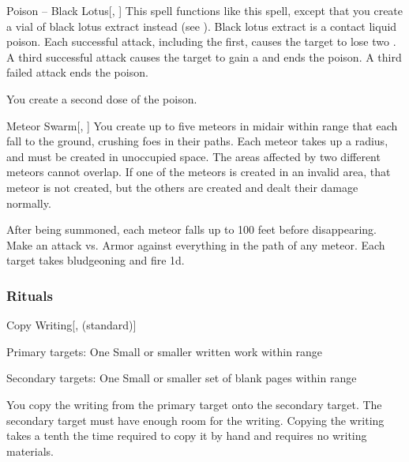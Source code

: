 \lowercase{\hypertarget{spell:Poison -- Black Lotus}{}}\label{spell:Poison -- Black Lotus}
\begin{freeability}[Rank 5]{\hypertarget{spell:Poison -- Black Lotus}{Poison -- Black Lotus}}[, ]
This spell functions like this  spell, except that you create a vial of black lotus extract instead (see ).
Black lotus extract is a contact liquid poison.
Each successful attack, including the first, causes the target to lose two .
A third successful attack causes the target to gain a  and ends the poison.
A third failed attack ends the poison.

\rankline
{} You create a second dose of the poison.
\end{freeability}
\vspace{0.25em}



\lowercase{\hypertarget{spell:Meteor Swarm}{}}\label{spell:Meteor Swarm}
\begin{freeability}[Rank 8]{\hypertarget{spell:Meteor Swarm}{Meteor Swarm}}[, ]
You create up to five meteors in midair within \rnglong range that each fall to the ground, crushing foes in their paths.
Each meteor takes up a \areasmall radius, and must be created in unoccupied space.
The areas affected by two different meteors cannot overlap.
If one of the meteors is created in an invalid area, that meteor is not created, but the others are created and dealt their damage normally.

After being summoned, each meteor falls up to 100 feet before disappearing.
Make an attack vs. Armor against everything in the path of any meteor.
\hit Each target takes bludgeoning and fire  \minus1d.
\end{freeability}
\vspace{0.25em}



\subsubsection{Rituals}


\lowercase{\hypertarget{spell:Copy Writing}{}}\label{spell:Copy Writing}
\begin{freeability}[Rank 1]{\hypertarget{spell:Copy Writing}{Copy Writing}}[,  (standard)]

Primary targets: One Small or smaller written work within \rngclose range
\par\noindent
Secondary targets: One Small or smaller set of blank pages within \rngclose range

You copy the writing from the primary target onto the secondary target.
The secondary target must have enough room for the writing.
Copying the writing takes a tenth the time required to copy it by hand and requires no writing materials.
\end{freeability}
\vspace{0.25em}



